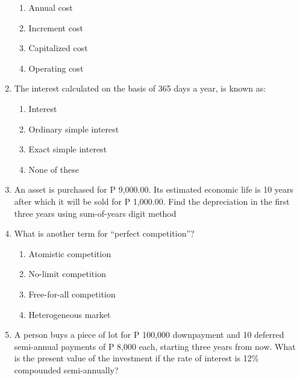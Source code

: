 \documentclass[11pt,a4paper]{article}
\begin{document}
\begin{enumerate}
\begin{enumerate}[label=\Alph*.]
\item{Annual cost}
\item{Increment cost}
\item{Capitalized cost}
\item{Operating cost}
\end{enumerate}
\item{The interest calculated on the basis of 365 days a year, is known as:}
\begin{enumerate}[label=\Alph*.]
\item{Interest}
\item{Ordinary simple interest}
\item{Exact simple interest}
\item{None of these}
\end{enumerate}
\item{An asset is purchased for P 9,000.00. Its estimated economic life is 10 years after which it will be sold for P 1,000.00. Find the depreciation in the first three years using sum-of-years digit method}
\\
\item{What is another term for ``perfect competition''?
}
\begin{enumerate}[label=\Alph*.]
\item{Atomistic competition}
\item{No-limit competition}
\item{Free-for-all competition}
\item{Heterogeneous market}
\end{enumerate}
\item{A person buys a piece of lot for P 100,000 downpayment and 10 deferred semi-annual payments of P 8,000 each, starting three years from now. What is the present value of the investment if the rate of interest is 12\% compounded semi-annually?}
\\
\end{enumerate}
\end{document}
